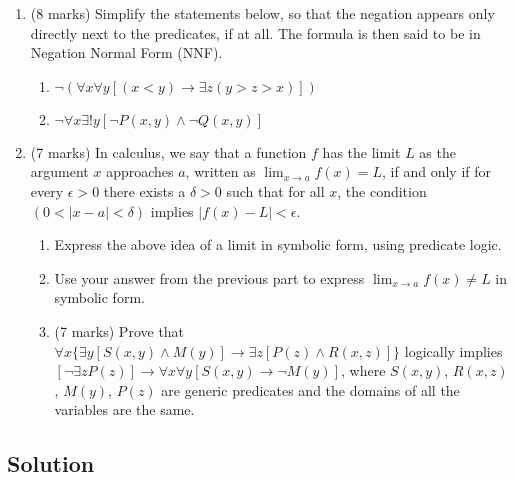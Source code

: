 \documentclass{article}
\begin{document}
\begin{enumerate}[label=\alph*.]
    \item (8 marks) Simplify the statements below, so that the negation appears only directly next to the predicates,
          if at all. The formula is then said to be in Negation Normal Form (NNF).
          \begin{enumerate}[label=\roman*.]
              \item $\neg(\forall x\forall y\left[(x<y)\to\exists z\left(y>z>x\right)\right])$
              \item $\lnot\forall x\exists!y\left[\lnot P(x,y)\land\lnot Q(x,y)\right]$
          \end{enumerate}
    \item (7 marks) In calculus, we say that a function \(f\) has the limit \(L\) as the argument \(x\) approaches \(a\), written as \(\lim_{x \to a} f(x) = L\), if and only if for every \(\epsilon > 0\) there exists a \(\delta > 0\) such that for all \(x\), the condition \((0 < |x − a| < \delta)\) implies \(| f (x) − L| < \epsilon\).
          \begin{enumerate}[label=\roman*.]
              \item Express the above idea of a limit in symbolic form, using predicate logic.
              \item Use your answer from the previous part to express \(\lim_{x \to a} f(x) \neq L\) in symbolic form.
              \item (7 marks) Prove that \( \forall x \{ \exists y [S(x, y) \land M(y)] \rightarrow \exists z [P(z) \land R(x, z)] \} \) logically implies \( [\neg \exists z P(z)] \rightarrow \forall x \forall y [S(x, y) \rightarrow \neg M(y)] \), where \( S(x, y) \), \( R(x, z) \), \( M(y) \), \( P(z) \) are generic predicates and the domains of all the variables are the same.
          \end{enumerate}
\end{enumerate}

\subsection*{Solution}
\end{document}
